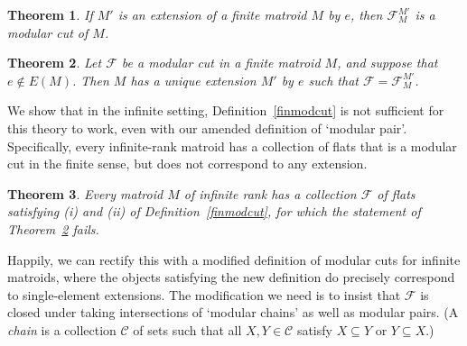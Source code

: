 \documentclass{amsart}
\theoremstyle{plain}
\newtheorem{theorem}{Theorem}[section]
\theoremstyle{definition}
\newcommand{\cC}{\mathcal{C}}
\newcommand{\cF}{\mathcal{F}}
\newcommand{\cI}{\mathcal{I}}
\renewcommand{\ss}{\subseteq}
\begin{document}
\begin{theorem}\label{finmodcutdeletion}
  If $M'$ is an extension of a finite matroid $M$ by $e$, then $\cF_M^{M'}$ is a modular cut of $M$. 
\end{theorem}
 
\begin{theorem}\label{finmodcutextension}
  Let $\cF$ be a modular cut in a finite matroid $M$, and suppose that $e \notin E(M)$. 
  Then $M$ has a unique extension $M'$ by $e$ such that $\cF = \cF_M^{M'}$. 
\end{theorem}



We show that in the infinite setting, Definition~\ref{finmodcut} is not sufficient for 
this theory to work, even with our amended definition of `modular pair'. 
Specifically, every infinite-rank matroid has a collection of flats
that is a modular cut in the finite sense, but does not correspond to any extension. 

\begin{theorem}
  Every matroid $M$ of infinite rank has a collection $\cF$ of flats
  satisfying (i) and (ii) of Definition~\ref{finmodcut}, 
  for which the statement of Theorem~\ref{finmodcutextension} fails. 
\end{theorem}

Happily, we can rectify this with a modified definition of modular cuts for infinite matroids,
where the objects satisfying the new definition do precisely correspond to single-element extensions. 
The modification we need is to insist that $\cF$ is closed under taking intersections of `modular chains'
as well as modular pairs. 
(A \emph{chain} is a collection $\cC$ of sets such that all $X,Y \in \cC$ satisfy $X \ss Y$ or $Y \ss X$.)
\end{document}
